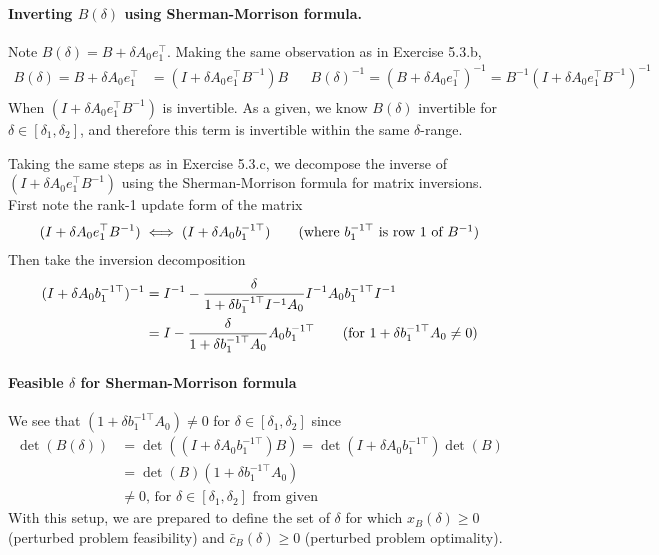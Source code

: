 \documentclass[11pt]{exam}
\begin{document}
\begin{questions}
    \paragraph{Inverting $B(\delta)$ using Sherman-Morrison formula.} Note $B(\delta) = B + \delta A_0 e_1^\top$. Making the same observation as in Exercise 5.3.b,
    \begin{align*}
      B(\delta) = B + \delta A_0 e_1^\top &= (I + \delta A_0 e_1^\top B^{-1})B && B(\delta)^{-1} = (B + \delta A_0 e_1^\top)^{-1} = B^{-1}(I + \delta A_0 e_1^\top B^{-1})^{-1}\\
    \end{align*}
    When $(I + \delta A_0 e_1^\top B^{-1})$ is invertible. As a given, we know $B(\delta)$ invertible for $\delta \in [\delta_1, \delta_2]$, and therefore this term is invertible within the same $\delta$-range. 
    
    Taking the same steps as in Exercise 5.3.c, we decompose the inverse of $(I + \delta A_0 e_1^\top B^{-1})$ using the Sherman-Morrison formula for matrix inversions. First note the rank-1 update form of the matrix
    \begin{align*}
      (I + \delta A_0 e_1^\top B^{-1}) \iff (I + \delta A_0 b^{-1\top}_1) \tag{where $b^{-1\top}_1$ is row 1 of $B^{-1}$}
    \end{align*}
    Then take the inversion decomposition
    \begin{align*}
      (I + \delta A_0 b^{-1\top}_1)^{-1} &= I^{-1} - \frac{\delta}{1 + \delta b^{-1\top}_1 I^{-1} A_0}I^{-1}A_0b^{-1\top}_1I^{-1}\\
      &= I - \frac{\delta}{1 + \delta b^{-1\top}_1 A_0}A_0b^{-1\top}_1 \tag{for $1 + \delta b_1^{-1\top}A_0 \neq 0$}
    \end{align*}



    \paragraph{Feasible $\delta$ for Sherman-Morrison formula} We see that $(1 + \delta b^{-1\top}_1 A_0 ) \neq 0$ for $\delta \in [\delta_1, \delta_2]$ since
    \begin{align*}
      \det(B(\delta)) &= \det((I + \delta A_0b_1^{-1\top})B) = \det(I + \delta A_0b_1^{-1\top})\det(B)\\
      &= \det(B) (1 + \delta b^{-1\top}_1 A_0 ) \tag{since $\det(I + uv^\top) = 1 + v^\top u$}\\
      &\neq 0 \text{, for $\delta \in [\delta_1, \delta_2]$ from given}
    \end{align*}
    With this setup, we are prepared to define the set of $\delta$ for which $x_B(\delta) \geq 0$ (perturbed problem feasibility) and $\bar c_B(\delta) \geq 0$ (perturbed problem optimality).
    

\end{questions}
\end{document}
